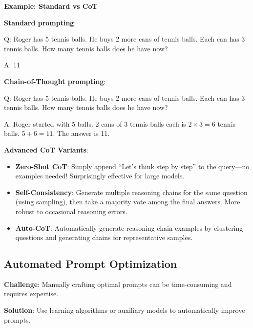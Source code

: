 \documentclass{article}
\begin{document}
\textbf{Example: Standard vs CoT}

\textbf{Standard prompting}:
\begin{tcolorbox}[colback=gray!5!white, colframe=gray!50!black]
Q: Roger has 5 tennis balls. He buys 2 more cans of tennis balls. Each can has 3 tennis balls. How many tennis balls does he have now?

A: 11
\end{tcolorbox}

\textbf{Chain-of-Thought prompting}:
\begin{tcolorbox}[colback=green!5!white, colframe=green!50!black]
Q: Roger has 5 tennis balls. He buys 2 more cans of tennis balls. Each can has 3 tennis balls. How many tennis balls does he have now?

A: Roger started with 5 balls. 2 cans of 3 tennis balls each is $2 \times 3 = 6$ tennis balls. $5 + 6 = 11$. The answer is 11.
\end{tcolorbox}

\textbf{Advanced CoT Variants}:

\begin{itemize}
\item \textbf{Zero-Shot CoT}: Simply append ``Let's think step by step'' to the query---no examples needed! Surprisingly effective for large models.

\item \textbf{Self-Consistency}: Generate multiple reasoning chains for the same question (using sampling), then take a majority vote among the final answers. More robust to occasional reasoning errors.

\item \textbf{Auto-CoT}: Automatically generate reasoning chain examples by clustering questions and generating chains for representative samples.
\end{itemize}

\subsection{Automated Prompt Optimization}

\textbf{Challenge}: Manually crafting optimal prompts can be time-consuming and requires expertise.

\textbf{Solution}: Use learning algorithms or auxiliary models to automatically improve prompts.

\begin{center}
\end{center}
\end{document}
